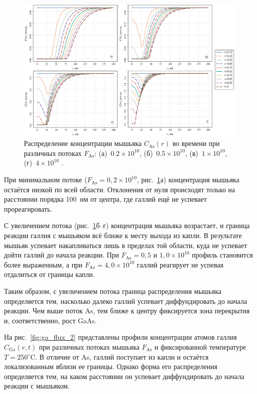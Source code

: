\documentclass[14pt,oneside]{extarticle}
\begin{document}
\begin{figure}[H]
    \begin{center}
    \includegraphics[width=15cm]{images/C_As_t_2.png}
    \caption{\label{fig:as_flux_2} Распределение концентрации мышьяка $C_{\text{As}}(r)$ во времени при различных потоках $F_{\text{As}}$: (а)~$0.2 \times 10^{10}$, (б)~$0.5 \times 10^{10}$, (в)~$1 \times 10^{10}$, (г)~$4 \times 10^{10}$ .}
    \end{center}
\end{figure}

При минимальном потоке ($F_{\text{As}} = 0{,}2 \times 10^{10}$, рис.~\ref{fig:as_flux_2}а) концентрация мышьяка остаётся низкой по всей области. Отклонения от нуля происходят только на расстоянии порядка 100~нм от центра, где галлий ещё не успевает прореагировать. 

С увеличением потока (рис.~\ref{fig:as_flux_2}б--г) концентрация мышьяка возрастает, и граница реакции галлия с мышьяком всё ближе к месту выхода из капли. В результате мышьяк успевает накапливаться лишь в пределах той области, куда не успевает дойти галлий до начала реакции. При $F_{\text{As}} = 0{,}5$ и $1{,}0 \times 10^{10}$ профиль становится более выраженным, а при $F_{\text{As}} = 4{,}0 \times 10^{10}$ галлий реагирует не успевая отдалиться от границы капли.

Таким образом, с увеличением потока граница распределения мышьяка\\ 
определяется тем, насколько далеко галлий успевает диффундировать до начала реакции. Чем выше поток As, тем ближе к центру фиксируется зона перекрытия и, соответственно, рост GaAs.

На рис.~\ref{fig:ga_flux_2} представлены профили концентрации атомов галлия $C_{\text{Ga}}(r, t)$ при различных потоках мышьяка $F_{\text{As}}$ и фиксированной температуре $T = 250^\circ$C. В отличие от As, галлий поступает из капли и остаётся локализованным вблизи ее границы. Однако форма его распределения определяется тем, на каком расстоянии он успевает диффундировать до начала реакции с мышьяком.
\end{document}
